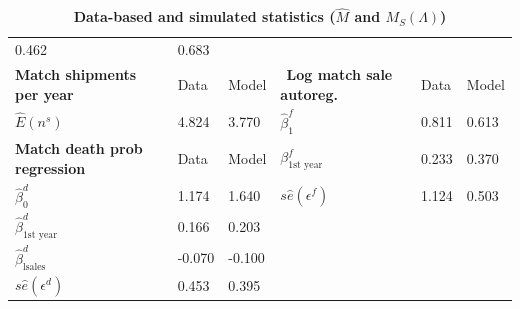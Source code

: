 \begin{table}
{\begin{tabular}{llllll}
        {0.462}                                                                       & {0.683} \\
        \textbf{Match shipments per year}                                             & {Data}                                         &
        {Model}                                                                       & $\ \ $\textbf{Log match sale autoreg.}         &
        {Data}                                                                        & {Model} \\ \hline
        $\widehat{E}\left( n^{s}\right) $                                             & {4.824}                                        &
        {3.770}                                                                       & $\widehat{\beta }_{1}^{f}$                     & {
        0.811}                                                                        & {0.613} \\
        \textbf{Match death prob regression}                                          & {Data}                                         &
        {Model}                                                                       & $\beta _{\mbox{1st
        year}}^{f}$                                                                   & {0.233}                                        & {0.370} \\
        \cline{1-3}
        $\widehat{\beta }_{0}^{d}$                                                    & {1.174}                                        & {
        1.640}                                                                        & $s\widehat{e}(\epsilon ^{f})$                  & {1.124}       &
        {0.503} \\
        $\widehat{\beta }_{\mbox{1st year}}^{d}$                                      & {0.166}                                        &
        {0.203}                                                                       &                                                &               & \\
        $\widehat{\beta }_{\mbox{lsales}}^{d}$                                        & {-0.070}                                       &
        {-0.100}                                                                      &                                                &               & \\
        $s\widehat{e}(\epsilon ^{d})$                                                 & {0.453}                                        &
        {0.395}                                                                       &                                                &               & \\ \hline
        \end{tabular}%
    }
\caption{\textbf{Data-based and simulated statistics ($\widehat{M}$ and $M_{S}(\Lambda)$)}}
\label{tab:est_results}
\end{table}
\pagebreak

